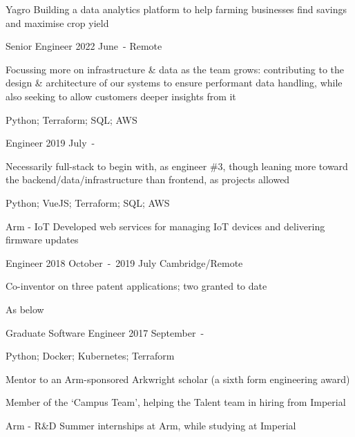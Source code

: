 \begin{cventries}

\cventryjob
  {Yagro}
  {Building a data analytics platform to help farming businesses find savings and maximise crop yield}

\cventryrole
  {Senior Engineer}
  {2022 June~-}
  {Remote}
  {\begin{cvitems}
    \item {Focussing more on infrastructure \& data as the team grows: contributing to the design \& architecture of our systems to ensure performant data handling, while also seeking to allow customers deeper insights from it}
    \item {Python; Terraform; SQL; AWS}
  \end{cvitems}}

\cventryrole
  {Engineer}
  {2019 July~-}
  {}
  {\begin{cvitems}
    \item {Necessarily full-stack to begin with, as engineer \#3, though leaning more toward the backend/data/infrastructure than frontend, as projects allowed}
    \item {Python; VueJS; Terraform; SQL; AWS}
  \end{cvitems}}

\cventryjob
  {Arm - IoT}
  {Developed web services for managing IoT devices and delivering firmware updates}

\cventryrole
  {Engineer}
  {2018 October~-~2019 July}
  {Cambridge/Remote}
  {\begin{cvitems}
    \item {Co-inventor on three patent applications; two granted to date}
    \item {As below}
  \end{cvitems}}

\cventryrole
  {Graduate Software Engineer}
  {2017 September~-}
  {}
  {\begin{cvitems}
    \item {Python; Docker; Kubernetes; Terraform}
    \item {Mentor to an Arm-sponsored Arkwright scholar (a sixth form engineering award)}
    \item {Member of the `Campus Team', helping the Talent team in hiring from Imperial}
  \end{cvitems}}

\cventryjob
  {Arm - R\&D}
  {Summer internships at Arm, while studying at Imperial}


\end{cventries}
